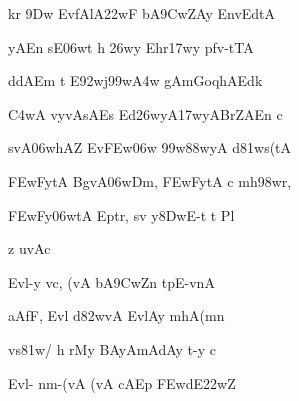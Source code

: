 {\dn kr\? \39Dw EvfAlA\322wF b\5A\39CwZAy Env\?EdtA \vegdn\dontdisplaylinenum}

{\dn yAEn sE\306wt h\? \326wy\2 Ehr\317wy\2 pfv-tTA{\dandabdn} \dontdisplaylinenum}

{\dn ddAEm t\? E\392wj\399w\?\3A4w g\5AmGoqhAEdk \vegdn\dontdisplaylinenum}

{\dn {}\3C4wA v\4y\0vAsA\2Es Ed\326wyA\317wyABrZAEn c{\dandabdn} \dontdisplaylinenum}

{\dn svA\0\306whAZ Ev\3FEw\?\306w \399w\388wyA d\381ws(tA \vegdn\dontdisplaylinenum}

{\dn \3FEwFytA\2 BgvA\306wDm\0, \3FEwFytA\2 c mh\?\398wr,{\dandabdn} \dontdisplaylinenum}

{\dn \3FEwFy\306wtA\2 Eptr, sv\?{\qvb} y\38DwE-t t\2 Pl \vegdn\dontdisplaylinenum}

{\dn z uvAc{\dandabdn}\dontdisplaylinenum }

{\dn Evl-y vc, (vA b\5A\39CwZ\?n tpE-vnA{\dandadn} \dontdisplaylinenum}

{\dn aAfF, Evl\2 d\382wvA EvlAy mhA(mn\? \vegdn\dontdisplaylinenum}

{\dn vs\?\381w/ h\? rMy\? BAyA\0mAdAy t-y c{\dandabdn} \dontdisplaylinenum}

{\dn Evl- nm-(vA (vA cAEp \3FEwdE\322wZ \vegdn\dontdisplaylinenum}


